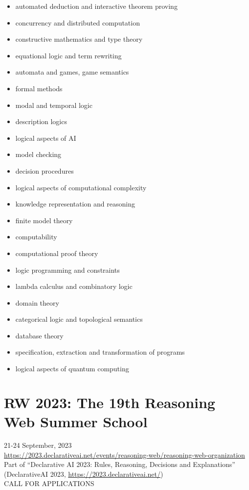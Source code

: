 \documentclass[prodmode,acmtecs]{acmsmall} %
\begin{document}
\begin{itemize}
\begin{itemize}\item  automated deduction and interactive theorem proving
\item  concurrency and distributed computation
\item  constructive mathematics and type theory
\item  equational logic and term rewriting
\item  automata and games, game semantics
\item  formal methods
\item  modal and temporal logic
\item  description logics
\item  logical aspects of AI 
\item  model checking
\item  decision procedures
\item  logical aspects of computational complexity
\item  knowledge representation and reasoning 
\item  finite model theory
\item  computability
\item  computational proof theory
\item  logic programming and constraints
\item  lambda calculus and combinatory logic
\item  domain theory
\item  categorical logic and topological semantics
\item  database theory
\item  specification, extraction and transformation of programs
\item  logical aspects of quantum computing
\end{itemize} 
\end{itemize}\section{RW 2023: The 19th Reasoning Web Summer School }\label{RW2023}  21-24 September, 2023\\ 
  \href{https://2023.declarativeai.net/events/reasoning-web/reasoning-web-organization}{https://2023.declarativeai.net/events/reasoning-web/reasoning-web-organization}\\ 
  Part of ``Declarative AI 2023: Rules, Reasoning, Decisions and Explanations'' (DeclarativeAI 2023, \href{https://2023.declarativeai.net/}{https://2023.declarativeai.net/})\\ 
CALL FOR APPLICATIONS 
\end{document}
